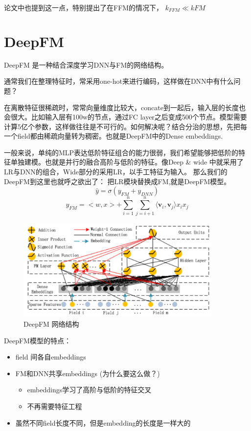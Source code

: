 \documentclass{article}
\begin{document}
\begin{CJK*}{UTF8}{gbsn}
论文中也提到这一点，特别提出了在FFM的情况下， $k_{FFM} \ll k{FM}$

\section{DeepFM}
DeepFM\cite{DBLP:journals/corr/GuoTYLH17} 是一种结合深度学习DNN与FM的网络结构。

通常我们在整理特征时，常采用one-hot来进行编码，这样做在DNN中有什么问题？

在离散特征很稀疏时，常常向量维度比较大，concate到一起后，输入层的长度也会很大。比如输入层有100w的节点，通过FC layer之后变成500个节点。模型需要计算5亿个参数，这样做往往是不可行的。如何解决呢？结合分治的思想，先把每一个field都由稀疏向量转为稠密。也就是DeepFM中的Dense embeddings.

一般来说，单纯的MLP表达低阶特征组合的能力很弱，我们希望能够把低阶的特征单独建模。也就是并行的融合高阶与低阶的特征。像Deep \& wide 中就采用了LR与DNN的组合，Wide部分的采用LR，以手工特征为输入。 那么我们的DeepFM到这里也就呼之欲出了： 把LR模块替换成FM,就是DeepFM模型。
$$\widehat{y}=\sigma(y_{FM}+y_{DNN})$$
$$y_{FM}=<w,x>+\sum_{i=1}^{n}\sum_{j=i+1}^{n}\langle \textbf{v}_{i} ,\textbf{v}_{j} \rangle x_{i}x_{j}$$


\begin{figure}[H]
\centering
\includegraphics[width=4in,height=2in]{deepfm}
\caption{DeepFM 网络结构}
\end{figure}

DeepFM模型的特点：
\begin{itemize}
\item field 间各自embeddings
\item FM和DNN共享embeddings (为什么要这么做？)
\begin{itemize}
\item embeddings学习了高阶与低阶的特征交叉
\item 不再需要特征工程
\end{itemize}
\item 虽然不同field长度不同，但是embedding的长度是一样大的


\end{itemize}
\end{CJK*}
\end{document}
